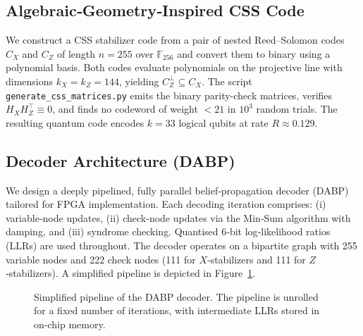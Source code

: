 \documentclass[conference]{IEEEtran}
\begin{document}
    \subsection{Algebraic‑Geometry‑Inspired CSS Code}
    We construct a CSS stabilizer code from a pair of nested Reed--Solomon codes $C_X$ and $C_Z$ of length $n=255$ over
$\mathbb{F}_{256}$ and convert them to binary using a polynomial basis.  Both codes evaluate polynomials on the
projective line with dimensions $k_X = k_Z = 144$, yielding $C_Z^\perp \subseteq C_X$.  The script
\texttt{generate\_css\_matrices.py} emits the binary parity-check matrices, verifies $H_X H_Z^\top \equiv 0$, and finds
no codeword of weight $<21$ in $10^3$ random trials.  The resulting quantum code encodes $k=33$ logical qubits at rate
$R\approx 0.129$.

    \subsection{Decoder Architecture (DABP)}

    We design a deeply pipelined, fully parallel belief‑propagation decoder (DABP) tailored for FPGA implementation.  
Each decoding iteration comprises: (i) variable‑node updates, (ii) check‑node updates via the Min‑Sum algorithm with 
damping, and (iii) syndrome checking.  Quantised 6‑bit log‑likelihood ratios (LLRs) are used throughout.  The decoder 
operates on a bipartite graph with 255 variable nodes and 222 check nodes (111 for $X$‑stabilizers and 111 for 
$Z$‑stabilizers).  A simplified pipeline is depicted in Figure~\ref{fig:dabp}.

    \begin{figure}[t]
      \centering
      \caption{Simplified pipeline of the DABP decoder.  The pipeline is unrolled for a fixed number of iterations, with
  intermediate LLRs stored in on‑chip memory.}
      \label{fig:dabp}
    \end{figure}
\end{document}
